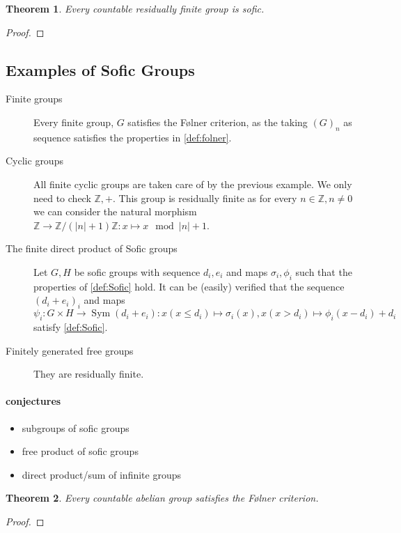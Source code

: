 \documentclass[a4paper]{report}
\newcommand{\Z}{\mathbb{Z}}
\DeclareMathOperator{\sym}{Sym}
\newtheorem{theorem}{Theorem}
\begin{document}
    \begin{theorem}
        Every countable residually finite group is sofic.
    \end{theorem}
    \begin{proof}
        
    \end{proof}

    \subsection{Examples of Sofic Groups}
    \begin{description}
        \item[Finite groups] Every finite group, $G$ satisfies the Følner criterion, as the taking $(G)_n$ as sequence satisfies the properties in \cref{def:folner}.
        \item[Cyclic groups] All finite cyclic groups are taken care of by the previous example. We only need to check $\Z,+$. This group is residually finite as for every $n \in \Z, n \ne 0$ we can consider the natural morphism $\Z \to \Z /(|n|+1)\Z: x \mapsto x \mod |n|+1$. 
        \item[The finite direct product of Sofic groups] Let $G, H$ be sofic groups with sequence $d_i, e_i$ and maps $\sigma_i, \phi_i$ such that the properties of \cref{def:Sofic} hold. It can be (easily) verified that the sequence $(d_i + e_i)_i$ and maps $\psi_i: G \times H \to \sym(d_i + e_i): x (x \le d_i) \mapsto \sigma_i(x), x (x > d_i) \mapsto \phi_i(x -d_i) + d_i$ satisfy \cref{def:Sofic}.
        \item[Finitely generated free groups] They are residually finite.
    \end{description}
    \paragraph{conjectures}
    \begin{itemize}
        \item subgroups of sofic groups
        \item free product of sofic groups
        \item direct product/sum of infinite groups
    \end{itemize}

    \begin{theorem}\label{thm:countable_abelian_folner}
        Every countable abelian group satisfies the Følner criterion. 
    \end{theorem}
    \begin{proof}
        
    \end{proof}
\end{document}
